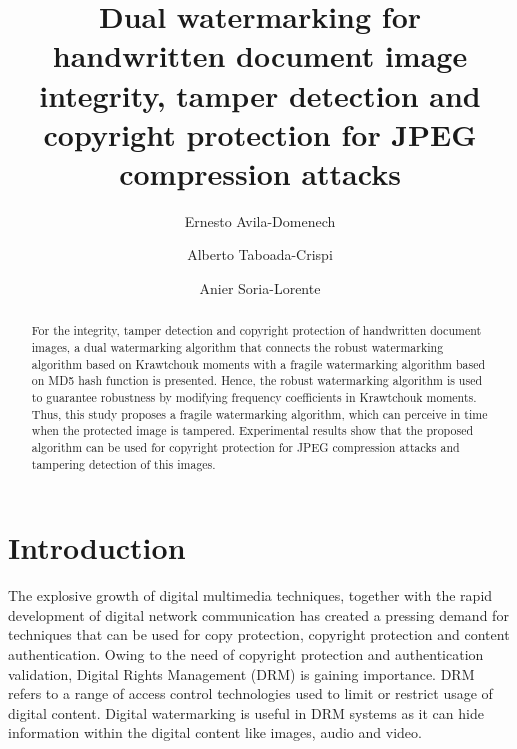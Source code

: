 \documentclass[runningheads]{llncs}
\begin{document}
%
\title{Dual watermarking for handwritten document image integrity, tamper detection and copyright protection for JPEG compression attacks}
%
%
\author{Ernesto Avila-Domenech \and
Alberto Taboada-Crispi \and
Anier Soria-Lorente}
%
%
%
\maketitle              %
%
\begin{abstract}
For the integrity, tamper detection and copyright protection of handwritten document images, a dual watermarking algorithm that connects the robust watermarking algorithm based on Krawtchouk moments with a fragile watermarking algorithm based on MD5 hash function is presented. Hence, the robust watermarking algorithm is used to guarantee robustness by modifying frequency coefficients in Krawtchouk moments. Thus, this study proposes a fragile watermarking algorithm, which can perceive in time when the protected image is tampered. Experimental results show that the proposed algorithm can be used for copyright protection for JPEG compression attacks and tampering detection of this images.

\end{abstract}
%
%
%
\section{Introduction}
The explosive growth of digital multimedia techniques, together with the rapid development of digital network communication has created a pressing demand for techniques that can be used for copy protection, copyright protection and content authentication. Owing to the need of copyright protection and authentication validation, Digital Rights Management (DRM) is gaining importance. DRM refers to a range of access control technologies used to limit or restrict usage of digital content. Digital watermarking is useful in DRM systems as it can hide information within the digital content like images, audio and video.
\end{document}
